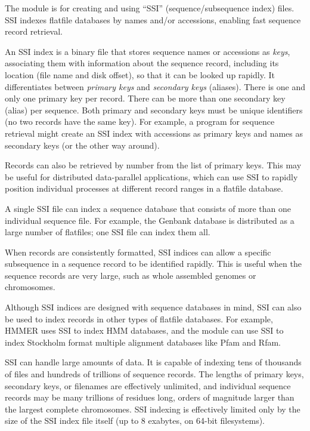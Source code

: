 The  module is for creating and using ``SSI''
(sequence/subsequence index) files. SSI indexes flatfile databases by
names and/or accessions, enabling fast sequence record retrieval. 

An SSI index is a binary file that stores sequence names or accessions
as \emph{keys}, associating them with information about the sequence
record, including its location (file name and disk offset), so that it
can be looked up rapidly. It differentiates between \emph{primary
keys} and \emph{secondary keys} (aliases).  There is one and only one
primary key per record. There can be more than one secondary key
(alias) per sequence. Both primary and secondary keys must be unique
identifiers (no two records have the same key). For example, a program
for sequence retrieval might create an SSI index with accessions as
primary keys and names as secondary keys (or the other way around).

Records can also be retrieved by number from the list of primary keys.
This may be useful for distributed data-parallel applications, which
can use SSI to rapidly position individual processes at different
record ranges in a flatfile database.

A single SSI file can index a sequence database that consists of more
than one individual sequence file. For example, the Genbank database
is distributed as a large number of flatfiles; one SSI file can index
them all.

When records are consistently formatted, SSI indices can allow a
specific subsequence in a sequence record to be identified
rapidly. This is useful when the sequence records are very large, such
as whole assembled genomes or chromosomes.

Although SSI indices are designed with sequence databases in mind, SSI
can also be used to index records in other types of flatfile
databases. For example, HMMER uses SSI to index HMM databases, and the
 module can use SSI to index Stockholm format multiple
alignment databases like Pfam and Rfam.

SSI can handle large amounts of data. It is capable of indexing tens
of thousands of files and hundreds of trillions of sequence records.
The lengths of primary keys, secondary keys, or filenames are
effectively unlimited, and individual sequence records may be many
trillions of residues long, orders of magnitude larger than the
largest complete chromosomes. SSI indexing is effectively limited only
by the size of the SSI index file itself (up to 8 exabytes, on 64-bit
filesystems).


